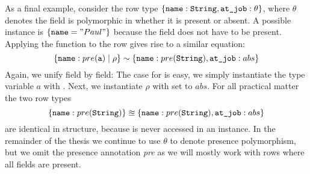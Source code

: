 As a final example, consider the row type $\left\{ \texttt{name}:\texttt{String},\texttt{at\_job}:\theta \right\}$, where $\theta$ denotes the field is polymorphic in whether it is present or absent. A possible instance is $\left\{ \texttt{name}="Paul" \right\}$ because the field  does not have to be present. Applying the function  to the row gives rise to a similar equation:
\[ 
\left\{ \texttt{name}:pre(\texttt{a}) \; | \; \rho \right\} \sim \left\{ \texttt{name}:pre(\texttt{String}),\texttt{at\_job}:abs \right\}
\]
Again, we unify field by field: The case for  is easy, we simply instantiate the type variable $a$ with . Next, we instantiate $\rho$ with  set to $abs$.  For all practical matter the two row types
\[ 
\left\{ \texttt{name}:pre(\texttt{String}) \right\} \approxeq \left\{ \texttt{name}:pre(\texttt{String}),\texttt{at\_job}:abs \right\}
\] 
are identical in structure, because  is never accessed in an instance. In the remainder of the thesis we continue to use $\theta$ to denote presence polymorphism, but we omit the presence annotation \emph{pre} as we will mostly work with rows where all fields are present.